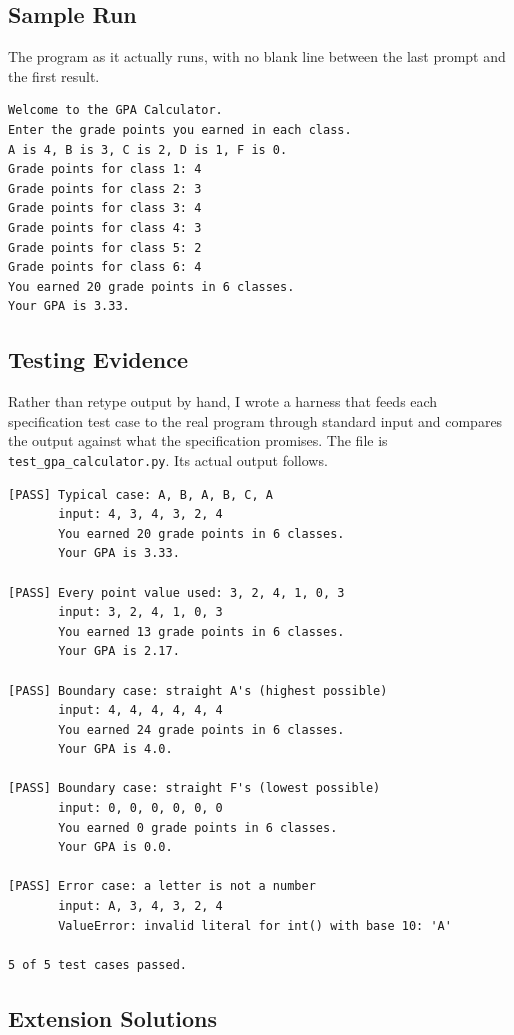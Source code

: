 \documentclass[11pt]{article}
\begin{document}
\subsection{Sample Run}
\label{sec:orga572440}

The program as it actually runs, with no blank line between the last prompt and the first result.\\

\begin{verbatim}
Welcome to the GPA Calculator.
Enter the grade points you earned in each class.
A is 4, B is 3, C is 2, D is 1, F is 0.
Grade points for class 1: 4
Grade points for class 2: 3
Grade points for class 3: 4
Grade points for class 4: 3
Grade points for class 5: 2
Grade points for class 6: 4
You earned 20 grade points in 6 classes.
Your GPA is 3.33.
\end{verbatim}
\subsection{Testing Evidence}
\label{sec:org47d01fb}

Rather than retype output by hand, I wrote a harness that feeds each specification test case to the real program through standard input and compares the output against what the specification promises. The file is \texttt{test\_gpa\_calculator.py}. Its actual output follows.\\

\begin{verbatim}
[PASS] Typical case: A, B, A, B, C, A
       input: 4, 3, 4, 3, 2, 4
       You earned 20 grade points in 6 classes.
       Your GPA is 3.33.

[PASS] Every point value used: 3, 2, 4, 1, 0, 3
       input: 3, 2, 4, 1, 0, 3
       You earned 13 grade points in 6 classes.
       Your GPA is 2.17.

[PASS] Boundary case: straight A's (highest possible)
       input: 4, 4, 4, 4, 4, 4
       You earned 24 grade points in 6 classes.
       Your GPA is 4.0.

[PASS] Boundary case: straight F's (lowest possible)
       input: 0, 0, 0, 0, 0, 0
       You earned 0 grade points in 6 classes.
       Your GPA is 0.0.

[PASS] Error case: a letter is not a number
       input: A, 3, 4, 3, 2, 4
       ValueError: invalid literal for int() with base 10: 'A'

5 of 5 test cases passed.
\end{verbatim}
\subsection{Extension Solutions}
\label{sec:org037277a}
\end{document}
